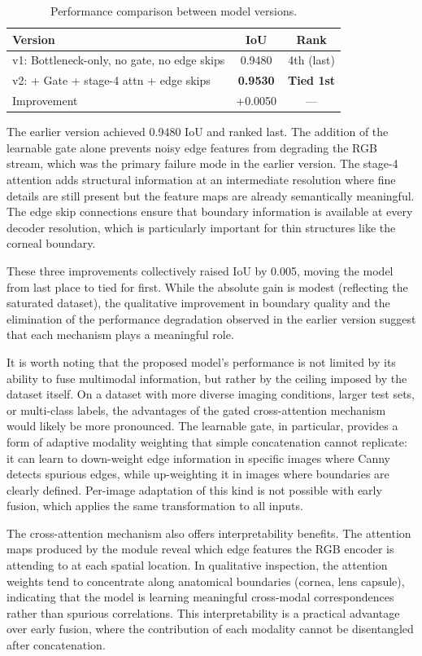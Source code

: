 \begin{table}[h]
\centering
\caption{Performance comparison between model versions.}
\label{tab:ablation}
\begin{tabular}{lcc}
\hline
\textbf{Version} & \textbf{IoU} & \textbf{Rank} \\
\hline
v1: Bottleneck-only, no gate, no edge skips & 0.9480 & 4th (last) \\
v2: + Gate + stage-4 attn + edge skips & \textbf{0.9530} & \textbf{Tied 1st} \\
Improvement & +0.0050 & --- \\
\hline
\end{tabular}
\end{table} The earlier version achieved 0.9480 IoU and ranked last. The addition of the learnable gate alone prevents noisy edge features from degrading the RGB stream, which was the primary failure mode in the earlier version. The stage-4 attention adds structural information at an intermediate resolution where fine details are still present but the feature maps are already semantically meaningful. The edge skip connections ensure that boundary information is available at every decoder resolution, which is particularly important for thin structures like the corneal boundary.

These three improvements collectively raised IoU by 0.005, moving the model from last place to tied for first. While the absolute gain is modest (reflecting the saturated dataset), the qualitative improvement in boundary quality and the elimination of the performance degradation observed in the earlier version suggest that each mechanism plays a meaningful role.

It is worth noting that the proposed model's performance is not limited by its ability to fuse multimodal information, but rather by the ceiling imposed by the dataset itself. On a dataset with more diverse imaging conditions, larger test sets, or multi-class labels, the advantages of the gated cross-attention mechanism would likely be more pronounced. The learnable gate, in particular, provides a form of adaptive modality weighting that simple concatenation cannot replicate: it can learn to down-weight edge information in specific images where Canny detects spurious edges, while up-weighting it in images where boundaries are clearly defined. Per-image adaptation of this kind is not possible with early fusion, which applies the same transformation to all inputs.

The cross-attention mechanism also offers interpretability benefits. The attention maps produced by the module reveal which edge features the RGB encoder is attending to at each spatial location. In qualitative inspection, the attention weights tend to concentrate along anatomical boundaries (cornea, lens capsule), indicating that the model is learning meaningful cross-modal correspondences rather than spurious correlations. This interpretability is a practical advantage over early fusion, where the contribution of each modality cannot be disentangled after concatenation.

